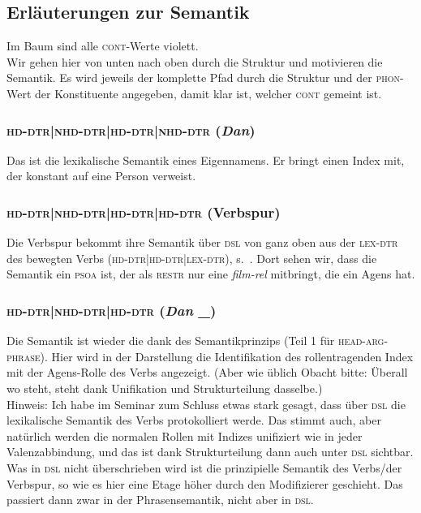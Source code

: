 \documentclass[10pt,a3paper]{article}
\newcommand{\violett}[1]{\textcolor{violett}{#1}}
\newcommand*{\mybox}[1]{\framebox{#1}}
\begin{document}
\newpage

\subsection{Erläuterungen zur Semantik}

Im Baum sind \violett{alle \textsc{cont}-Werte violett.}\\

Wir gehen hier von unten nach oben durch die Struktur und motivieren die Semantik.
Es wird jeweils der komplette Pfad durch die Struktur und der \textsc{phon}-Wert der Konstituente angegeben, damit klar ist, welcher \textsc{cont} gemeint ist.

\subsubsection{\textsc{hd-dtr|nhd-dtr|hd-dtr|nhd-dtr} (\textit{Dan})}

Das ist die lexikalische Semantik eines Eigennamens. 
Er bringt einen Index mit, der konstant auf eine Person verweist.

\subsubsection{\textsc{hd-dtr|nhd-dtr|hd-dtr|hd-dtr} (Verbspur)}

Die Verbspur bekommt ihre Semantik über \textsc{dsl} von ganz oben aus der \textsc{lex-dtr} des bewegten Verbs (\textsc{hd-dtr|hd-dtr|lex-dtr}), s.\ \mybox{1002}.
Dort sehen wir, dass die Semantik ein \textsc{psoa} ist, der als \textsc{restr} nur eine \textit{film-rel} mitbringt, die ein Agens hat.

\subsubsection{\textsc{hd-dtr|nhd-dtr|hd-dtr} (\textit{Dan \_})}\label{sec:danvspur}

Die Semantik ist wieder die \mybox{1002} dank des Semantikprinzips (Teil 1 für \textsc{head-arg-phrase}).
Hier wird in der Darstellung die Identifikation des rollentragenden Index \mybox{1003} mit der Agens-Rolle des Verbs angezeigt.
(Aber wie üblich Obacht bitte: Überall wo \mybox{1002} steht, steht dank Unifikation und Strukturteilung dasselbe.)\\

Hinweis: Ich habe im Seminar zum Schluss etwas stark gesagt, dass über \textsc{dsl} die lexikalische Semantik des Verbs protokolliert werde.
Das stimmt auch, aber natürlich werden die normalen Rollen mit Indizes unifiziert wie in jeder Valenzabbindung, und das ist dank Strukturteilung dann auch unter \textsc{dsl} sichtbar.
Was in \textsc{dsl} nicht überschrieben wird ist die prinzipielle Semantik des Verbs\slash der Verbspur, so wie es hier eine Etage höher durch den Modifizierer geschieht.
Das passiert dann zwar in der Phrasensemantik, nicht aber in \textsc{dsl}.
\end{document}
